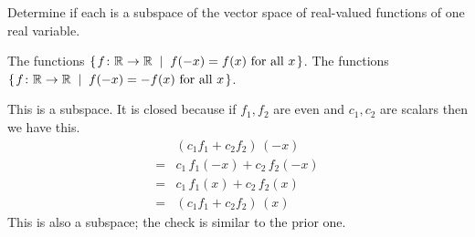 

\begin{Exercise}[
name={},
title={}, 
difficulty=0,
origin={\cite{JH}}]
Determine if each is a subspace of the vector space of real-valued
functions of one real variable.

\Question The 
         functions
        \( \mbox{$\left\{\hspace{0.1em}\mbox{$f\colon \mathbb{R}\to \mathbb{R}$} \;\;\middle|\;\; f(-x)=f(x) \text{ for all } x\hspace{0.1em}\right\}$} \).
\Question The 
        functions
        \( \mbox{$\left\{\hspace{0.1em}\mbox{$f\colon \mathbb{R}\to \mathbb{R}$} \;\;\middle|\;\; f(-x)=-f(x) \text{ for all } x\hspace{0.1em}\right\}$} \).
\end{Exercise}

\begin{Answer}
\Question This is a subspace.
          It is closed because if \( f_1,f_2 \) are even and
          \( c_1,c_2 \) are scalars then we have this.
          \begin{align*}
            & (c_1f_1+c_2f_2)\,(-x)\\
            =& c_1\,f_1(-x)+c_2\,f_2(-x)\\
            =& c_1\,f_1(x)+c_2\,f_2(x)\\
            =& (c_1f_1+c_2f_2)\,(x)
          \end{align*}
\Question This is also a subspace; the check is similar to
          the prior one.

\end{Answer}
